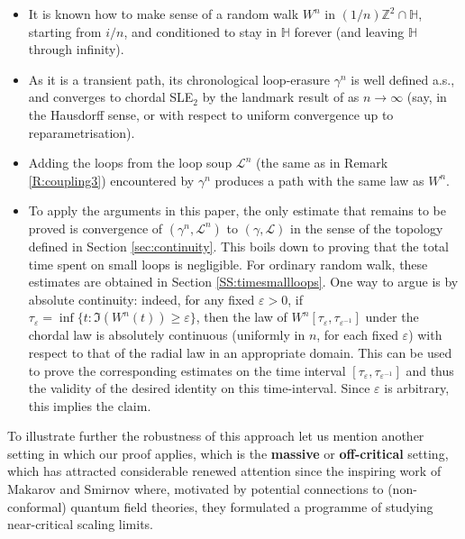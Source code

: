 \documentclass[11pt]{article}
\def\cL{{\mathcal L}}
\def\eps{\varepsilon}
\begin{document}
\begin{itemize}
    \item It is known how to make sense of a random walk $W^n$ in $(1/n)\mathbb{Z}^2 \cap \mathbb{H}$, starting from $i/n$, and conditioned to stay in $\mathbb{H}$ forever (and leaving $\mathbb{H}$ through infinity).
    \item As it is a transient path, its chronological loop-erasure $\gamma^n$ is well defined a.s., and converges to chordal SLE$_2$ by the landmark result of \cite{LSW} as $n\to \infty$ (say, in the Hausdorff sense, or with respect to uniform convergence up to reparametrisation). 
    \item Adding the loops from the loop soup $\cL^n$ (the same as in Remark \ref{R:coupling3}) encountered by $\gamma^n$ produces a path with the same law as $W^n$.
    \item To apply the arguments in this paper, the only estimate that remains to be proved is convergence of $(\gamma^n, \cL^n)$ to $(\gamma, \cL)$ in the sense of the topology defined in Section \ref{sec:continuity}. This boils down to proving that the total time spent on small loops is negligible. For ordinary random walk, these estimates are obtained in Section \ref{SS:timesmallloops}. One way to argue is by absolute continuity: indeed, for any fixed $\eps>0$, if $\tau_\eps = \inf\{ t: \Im ( W^n(t)) \ge \eps\}$, then the law of $W^n[\tau_\eps, \tau_{\eps^{-1}}]$ under the chordal law is absolutely continuous (uniformly in $n$, for each fixed $\eps$) with respect to that of the radial law in an appropriate domain. This can be used to prove the corresponding estimates on the time interval $[\tau_\eps, \tau_{\eps^{-1}}]$ and thus the validity of the desired identity on this time-interval. Since $\eps$ is arbitrary, this implies the claim.   
\end{itemize}



\medskip To illustrate further the robustness of this approach let us mention another setting in which our proof applies, which is the \textbf{massive} or \textbf{off-critical} setting, which has attracted considerable renewed attention since the inspiring work of Makarov and Smirnov \cite{MakarovSmirnov} where,  motivated by potential connections to (non-conformal) quantum field theories, they formulated a programme of studying near-critical scaling limits. 
\end{document}
